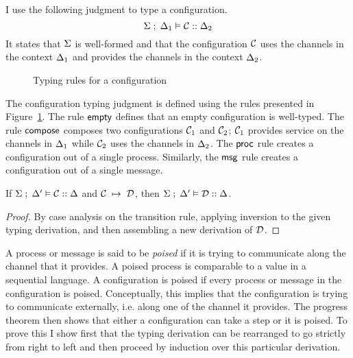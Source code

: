 I use the following judgment to type a configuration.
\[
\Sigma \; ; \; \Delta_1 \vDash \mathcal{C} :: \Delta_2
\]
It states that $\Sigma$ is well-formed
and that the configuration $\mathcal{C}$
uses the channels in the context $\Delta_1$ and provides
the channels in the context $\Delta_2$.
\begin{figure}[t]
\caption{Typing rules for a configuration}
\label{fig:config_typing}
\end{figure}
The configuration typing judgment is defined using
the rules presented in Figure~\ref{fig:config_typing}.
%
The rule $\mathsf{empty}$ defines that an empty configuration
is well-typed. The rule $\mathsf{compose}$
composes two
configurations $\mathcal{C}_1$ and $\mathcal{C}_2$; $\mathcal{C}_1$ provides
service on the channels in $\Delta_1$ while $\mathcal{C}_2$ uses
the channels in $\Delta_2$. The $\mathsf{proc}$ rule creates a configuration
out of a single process. Similarly, the $\mathsf{msg}$ rule creates a
configuration out of a single message.

\begin{theorem}
\label{thm:preservation}
If $\Sigma \; ; \; \Delta' \vDash \mathcal{C} :: \Delta$ and $\mathcal{C} \; \mapsto \; \mathcal{D}$,
then $\Sigma \; ; \; \Delta' \vDash \mathcal{D} :: \Delta$.
\end{theorem}
\begin{proof}
  By case analysis on the transition rule, applying inversion to the
  given typing derivation, and then assembling a new derivation of
  $\mathcal{D}$.
\end{proof}

A process or message is said to be \emph{poised} if it is trying to
communicate along the channel that it provides.  A poised process is
comparable to a value in a sequential language. A configuration is
poised if every process or message in the configuration is poised.
Conceptually, this implies that the configuration is trying to communicate
externally, i.e. along one of the channel it provides.
The progress theorem then shows that either a configuration can take a
step or it is poised.  To prove this I show first that the typing
derivation can be rearranged to go strictly from right to left and
then proceed by induction over this particular derivation.

